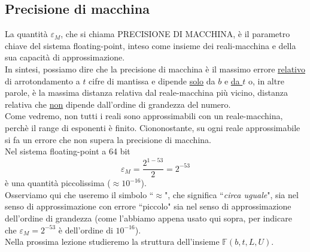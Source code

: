 \documentclass[12pt]{article}
\begin{document}
\subsection{Precisione di macchina}
La quantità $\varepsilon_M$, che si chiama PRECISIONE DI MACCHINA, è il parametro chiave del sistema floating-point, inteso come insieme dei reali-macchina e della sua capacità di approssimazione. \\
In sintesi, possiamo dire che la precisione di macchina è il massimo errore \uline{relativo} di arrotondamento a $t$ cifre di mantissa e dipende \uline{solo} da $b$ e \uline{da $t$} o, in altre parole, è la massima distanza relativa dal reale-macchina più vicino, distanza relativa che \uline{non} dipende dall'ordine di grandezza del numero. \\
Come vedremo, non tutti i reali sono approssimabili con un reale-macchina, perchè il range di esponenti è finito. Ciononostante, su ogni reale approssimabile si fa un errore che non supera la precisione di macchina. \\
Nel sistema floating-point a 64 bit \[ \varepsilon_M = \frac{2^{1-53}}{2} = 2^{-53}\] 
è una quantità piccolissima ($\approx 10^{-16}$). \\
Osserviamo qui che useremo il simbolo ``$\approx$", che significa ``\textit{circa uguale}", sia nel senso di approssimazione con errore ``piccolo" sia nel senso di approssimazione dell'ordine di grandezza (come l'abbiamo appena usato qui sopra, per indicare che $\varepsilon_M = 2^{-53}$ è dell'ordine di $10^{-16}$). \\
Nella prossima lezione studieremo la struttura dell'insieme $\mathbb{F}(b, t, L, U)$.
\end{document}
